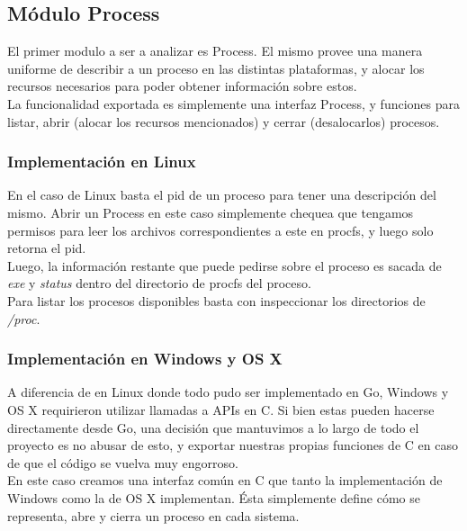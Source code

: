 \subsection{Módulo Process}

El primer modulo a ser a analizar es Process. El mismo provee una manera
uniforme de describir a un proceso en las distintas plataformas, y alocar los
recursos necesarios para poder obtener información sobre estos.\\

La funcionalidad exportada es simplemente una interfaz Process, y funciones
para listar, abrir (alocar los recursos mencionados) y cerrar (desalocarlos)
procesos.\\

\subsubsection{Implementación en Linux}

En el caso de Linux basta el pid de un proceso para tener una descripción del
mismo. Abrir un Process en este caso simplemente chequea que tengamos permisos
para leer los archivos correspondientes a este en procfs, y luego solo retorna
el pid.\\

Luego, la información restante que puede pedirse sobre el proceso es sacada de
\textit{exe} y \textit{status} dentro del directorio de procfs del proceso.\\

Para listar los procesos disponibles basta con inspeccionar los directorios de
\textit{/proc}.

\subsubsection{Implementación en Windows y OS X}

A diferencia de en Linux donde todo pudo ser implementado en Go, Windows y OS X
requirieron utilizar llamadas a APIs en C. Si bien estas pueden hacerse
directamente desde Go, una decisión que mantuvimos a lo largo de todo el
proyecto es no abusar de esto, y exportar nuestras propias funciones de C en
caso de que el código se vuelva muy engorroso.\\

En este caso creamos una interfaz común en C que tanto la implementación de
Windows como la de OS X implementan. Ésta simplemente define cómo se representa,
abre y cierra un proceso en cada sistema.\\

